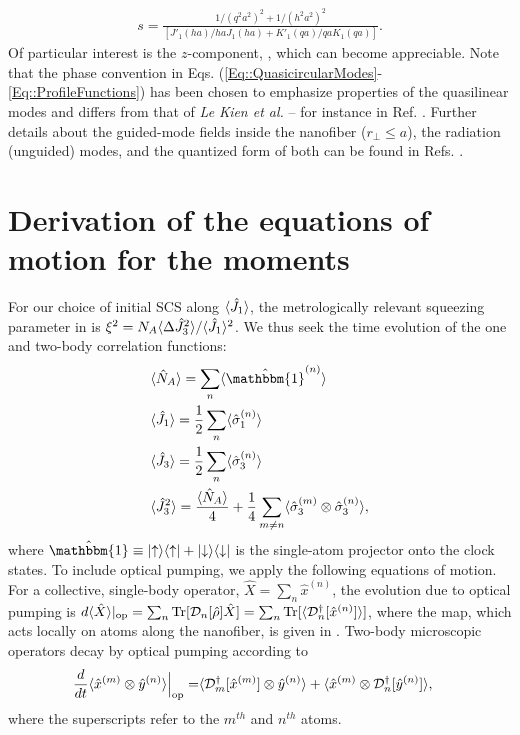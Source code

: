 \documentclass[preprint, aps,pra,onecolumn]{revtex4-1} %
\newcommand{\jx}{\hat{J}_1}
\begin{document}
\begin{appendix}
	\begin{align}
		s = \frac{1/(q^2 a^2)^{2} + 1/(h^2 a^2)^{2}}{[J'_1(ha)/haJ_1(ha) + K'_1(qa)/qaK_1(qa)]}.
	\end{align}  
Of particular interest is the $z$-component, , which can become appreciable.  Note that the phase convention in Eqs. (\ref{Eq::QuasicircularModes}-\ref{Eq::ProfileFunctions}) has been chosen to emphasize properties of the quasilinear modes and differs from that of \emph{Le Kien et al.} -- for instance in Ref. \cite{le_kien_propagation_2014}.  
Further details about the guided-mode fields inside the nanofiber ($r_\perp\leq a$), the radiation (unguided) modes, and the quantized form of both can be found in Refs. \cite{sondergaard_general_2001, tong_single-mode_2004, kien_field_2004, le_kien_spontaneous_2005, Vetsch thesis}.


\section{Derivation of the equations of motion for the moments} \label{Appendix::OpticalPumping}	

For our choice of initial SCS along $\expt{\jx}$, the metrologically relevant squeezing parameter in  is $\xi^2 = N_A \langle{\Delta \hat{J}_3^2}\rangle/\langle{\hat{J}_1}\rangle^2$.  
We thus seek the time evolution of the one and two-body correlation functions:
\begin{align}
&\expt{\hat{N}_A} = \sum_n \expt{\hat{\mathbbm{1}}^{(n)}} \\
&\expt{\hat{J}_1} = \frac{1}{2} \sum_n \expt{\hat{\sigma}_1^{(n)}} \\
&\expt{\hat{J}_3} = \frac{1}{2} \sum_n \expt{\hat{\sigma}_3^{(n)}} \\
&\expt{\hat{J}_3^2} = \frac{\expt{\hat{N}_A}}{4} +\frac{1}{4} \sum_{m \neq n} \expt{\hat{\sigma}_3^{(m)}\otimes \hat{\sigma}_3^{(n)}}, 
\end{align}
where $\hat{\mathbbm{1}} \equiv \op{\uparrow}{\uparrow} + \op{\downarrow}{\downarrow}$ is the single-atom projector onto the clock states. 
To include optical pumping, we apply the following equations of motion. For a collective, single-body operator, $\hat{X} = \sum_n \hat{x}^{(n)}$, the evolution due to optical pumping is $d\langle{ \hat{X}}\rangle|_{\rm op} = \sum_n \mbox{Tr} [\mathcal{D}_n[\hat{\rho}]\hat{X} ] = \sum_n \mbox{Tr} [\langle{\mathcal{D}_n^\dagger[\hat{x}^{(n)}]}\rangle ] $, where the map, which acts locally on atoms along the nanofiber, is given in .  
Two-body microscopic operators decay by optical pumping according to \cite{baragiola_three-dimensional_2014}
	\begin{align} \label{Eq::TwoBodyDecay}
		\frac{d}{dt} \langle{ \hat{x}^{(m)} \otimes \hat{y}^{(n)} }\rangle \Big|_{\rm op}= &\langle{ \mathcal{D}_m^\dagger[ \hat{x}^{(m)}] \otimes \hat{y}^{(n)} }\rangle + \langle{ \hat{x}^{(m)}\otimes \mathcal{D}_n^\dagger[ \hat{y}^{(n)}] }\rangle,
	\end{align}
where the superscripts refer to the $m^{th}$ and $n^{th}$ atoms. 


\end{appendix}
\end{document}
